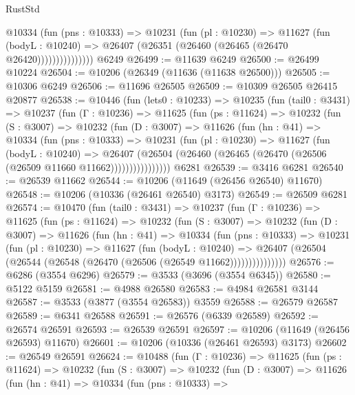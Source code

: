\begin{lexlean}{RustStd}
\begin{coremodule}
                  @10334
                    (fun (pns : @10333) =>
                    @10231
                      (fun (pl : @10230) =>
                      @11627
                        (fun (bodyL : @10240) =>
                        @26407 (@26351 (@26460 (@26465 (@26470 @26420)))))))))))))))
    @6249
@26499 := @11639 @6249
@26500 := @26499 @10224
@26504 := @10206 (@26349 (@11636 (@11638 @26500)))
@26505 := @10306 @6249
@26506 := @11696 @26505
@26509 := @10309 @26505 @26415 @20877
@26538 := @10446
    (fun (lets0 : @10233) =>
    @10235
      (fun (tail0 : @3431) =>
      @10237
        (fun (Γ : @10236) =>
        @11625
          (fun (ps : @11624) =>
          @10232
            (fun (S : @3007) =>
            @10232
              (fun (D : @3007) =>
              @11626
                (fun (hn : @41) =>
                @10334
                  (fun (pns : @10333) =>
                  @10231
                    (fun (pl : @10230) =>
                    @11627
                      (fun (bodyL : @10240) =>
                      @26407
                        (@26504
                          (@26460 (@26465 (@26470 (@26506 (@26509 @11660 @11662))))))))))))))))
    @6281
@26539 := @3416 @6281
@26540 := @26539 @11662
@26544 := @10206 (@11649 (@26456 @26540) @11670)
@26548 := @10206 (@10336 (@26461 @26540) @3173)
@26549 := @26509 @6281
@26574 := @10470
    (fun (tail0 : @3431) =>
    @10237
      (fun (Γ : @10236) =>
      @11625
        (fun (ps : @11624) =>
        @10232
          (fun (S : @3007) =>
          @10232
            (fun (D : @3007) =>
            @11626
              (fun (hn : @41) =>
              @10334
                (fun (pns : @10333) =>
                @10231
                  (fun (pl : @10230) =>
                  @11627
                    (fun (bodyL : @10240) =>
                    @26407 (@26504 (@26544 (@26548 (@26470 (@26506 (@26549 @11662)))))))))))))))
@26576 := @6286 (@3554 @6296)
@26579 := @3533 (@3696 (@3554 @6345))
@26580 := @5122 @5159
@26581 := @4988 @26580
@26583 := @4984 @26581 @3144
@26587 := @3533 (@3877 (@3554 @26583)) @3559
@26588 := @26579 @26587
@26589 := @6341 @26588
@26591 := @26576 (@6339 @26589)
@26592 := @26574 @26591
@26593 := @26539 @26591
@26597 := @10206 (@11649 (@26456 @26593) @11670)
@26601 := @10206 (@10336 (@26461 @26593) @3173)
@26602 := @26549 @26591
@26624 := @10488
    (fun (Γ : @10236) =>
    @11625
      (fun (ps : @11624) =>
      @10232
        (fun (S : @3007) =>
        @10232
          (fun (D : @3007) =>
          @11626
            (fun (hn : @41) =>
            @10334
              (fun (pns : @10333) =>

\end{coremodule}
\end{lexlean}
